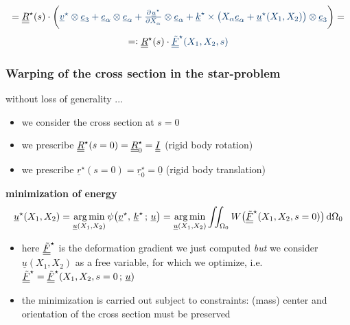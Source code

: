 \begin{frame}
  \begin{displaymath}
    = \doubleunderline{R}^{\star}(s) \cdot \biggl( {\color{faublue}
        \underline{v}^{\star} \otimes \underline{e}_3 + 
        \underline{e}_{\alpha} \otimes \underline{e}_{\alpha} + 
        \pd{\underline{u}^{\star}}{X_{\alpha}} \otimes \underline{e}_{\alpha} +
        \underline{k}^{\star} \times \bigl( X_{\alpha} \underline{e}_{\alpha} + \underline{u}^{\star}(X_1,X_2) \bigr) \otimes \underline{e}_3 }
      \biggr) =
  \end{displaymath}
  \begin{displaymath}
    =: \doubleunderline{R}^{\star}(s) \cdot {\color{faublue} \doubleunderline{\tilde{F}}^{\star} (X_1,X_2,s) }
  \end{displaymath}
\end{frame}


\begin{frame}
  \frametitle{Warping of the cross section in the star-problem}
  without loss of generality ...
  \begin{itemize}
    \item we consider the cross section at $s=0$
    \item we prescribe $ \underline{\underline{R}}^{\star}(s=0) = \underline{\underline{R}}^{\star}_0 = \underline{\underline{I}}$ \: (rigid body rotation)
    \item we prescribe $ \underline{r}^{\star}(s=0) = \underline{r}^{\star}_0 = \underline{0}$ \: (rigid body translation)
  \end{itemize}

  \vspace{1em}
  \textbf{minimization of energy}
  \begin{displaymath}
    \underline{u}^{\star}(X_1,X_2) =
    \argmin_{\underline{u}(X_1,X_2)} \psi \bigl( \underline{v}^{\star}, \, \underline{k}^{\star} \, ; \, \underline{u} \bigr) =
    \argmin_{\underline{u}(X_1,X_2)} \iint_{\Omega_0} W \bigl( \doubleunderline{\tilde{F}}^{\star}(X_1,X_2,s=0) \bigr)  \dif \Omega_0
  \end{displaymath}
  \begin{itemize}
    \item here $\underline{\underline{\tilde{F}}}^{\star}$ is the deformation gradient we just computed \textit{but} we consider $\underline{u}(X_1,X_2)$ as a free variable, for which we optimize, i.e. $\underline{\underline{\tilde{F}}}^{\star} = \underline{\underline{\tilde{F}}}^{\star}(X_1,X_2,s=0 \, ; \, \underline{u})$
    \item the minimization is carried out subject to constraints: \newline
      (mass) center and orientation of the cross section must be preserved 
  \end{itemize}
  
  
\end{frame}


